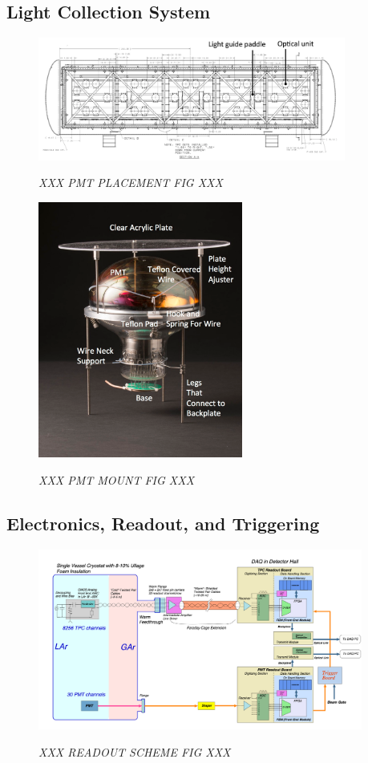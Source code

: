 \subsection{Light Collection System}

\begin{figure}[ht!]
\centering
	\includegraphics[width=0.9\textwidth]{Figures/pmt_placement.png} \\
\caption{\textit{ XXX PMT PLACEMENT FIG XXX}}\label{pmt_placement_fig}
\end{figure}


\begin{figure}[ht!]
\centering
	\includegraphics[width=0.6\textwidth]{Figures/mount_PMT_labeled.png} \\
\caption{\textit{ XXX PMT MOUNT FIG XXX}}\label{pmt_mount_fig}
\end{figure}


\subsection{Electronics, Readout, and Triggering}

\begin{figure}[ht!]
\centering
	\includegraphics[width=0.95\textwidth]{Figures/UB_readout_scheme.png} \\
\caption{\textit{ XXX READOUT SCHEME FIG XXX}}\label{readout_scheme_fig}
\end{figure}


